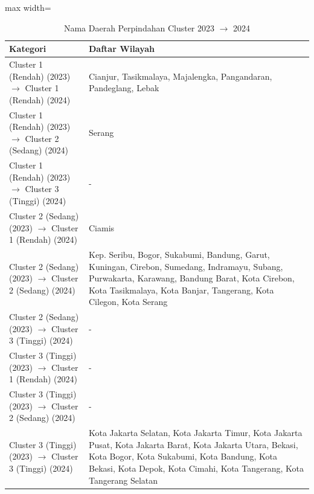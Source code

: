 \begin{table}[H]
\centering
\caption{Nama Daerah Perpindahan Cluster 2023 \(\rightarrow\) 2024} \makeatletter{}\makeatother
\begin{adjustbox}{max width=\textwidth}
\begin{tabular}{|p{4cm}|p{10cm}|}
\hline
\textbf{Kategori} & \textbf{Daftar Wilayah} \\
\hline
Cluster 1 (Rendah) (2023) \(\rightarrow\) Cluster 1 (Rendah) (2024) & Cianjur, Tasikmalaya, Majalengka, Pangandaran, Pandeglang, Lebak \\
\hline
Cluster 1 (Rendah) (2023) \(\rightarrow\) Cluster 2 (Sedang) (2024) & Serang \\
\hline
Cluster 1 (Rendah) (2023) \(\rightarrow\) Cluster 3 (Tinggi) (2024) & - \\
\hline
Cluster 2 (Sedang) (2023) \(\rightarrow\) Cluster 1 (Rendah) (2024) & Ciamis \\
\hline
Cluster 2 (Sedang) (2023) \(\rightarrow\) Cluster 2 (Sedang) (2024) & Kep. Seribu, Bogor, Sukabumi, Bandung, Garut, Kuningan, Cirebon, Sumedang, Indramayu, Subang, Purwakarta, Karawang, Bandung Barat, Kota Cirebon, Kota Tasikmalaya, Kota Banjar, Tangerang, Kota Cilegon, Kota Serang \\
\hline
Cluster 2 (Sedang) (2023) \(\rightarrow\) Cluster 3 (Tinggi) (2024) & - \\
\hline
Cluster 3 (Tinggi) (2023) \(\rightarrow\) Cluster 1 (Rendah) (2024) & - \\
\hline
Cluster 3 (Tinggi) (2023) \(\rightarrow\) Cluster 2 (Sedang) (2024) & - \\
\hline
Cluster 3 (Tinggi) (2023) \(\rightarrow\) Cluster 3 (Tinggi) (2024) & Kota Jakarta Selatan, Kota Jakarta Timur, Kota Jakarta Pusat, Kota Jakarta Barat, Kota Jakarta Utara, Bekasi, Kota Bogor, Kota Sukabumi, Kota Bandung, Kota Bekasi, Kota Depok, Kota Cimahi, Kota Tangerang, Kota Tangerang Selatan \\
\hline
\end{tabular}
\end{adjustbox}
\end{table}